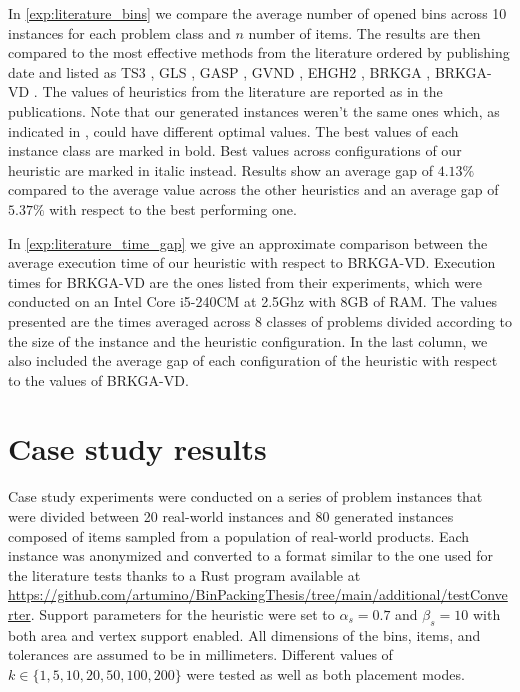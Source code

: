 In \cref{exp:literature_bins} we compare the average number of opened bins across 10 instances for each problem class and $n$ number of items.
The results are then compared to the most effective methods from the literature ordered by publishing date and listed as TS3 \citep{lodi2002heuristic}, GLS \citep{faroe2003guided}, GASP \citep{crainic2009ts2pack}, GVND \citep{parreno2010hybrid}, EHGH2 \citep{hifi2014hybrid}, BRKGA \citep{gonccalves2013biased}, BRKGA-VD \citep{zudio2018brkga}.
The values of heuristics from the literature are reported as in the publications. Note that our generated instances weren't the same ones which, as indicated in \cite{hifi2014hybrid}, could have different optimal values.
The best values of each instance class are marked in bold. Best values across configurations of our heuristic are marked in italic instead.
Results show an average gap of $4.13\%$ compared to the average value across the other heuristics and an average gap of $5.37\%$ with respect to the best performing one.

In \cref{exp:literature_time_gap} we give an approximate comparison between the average execution time of our heuristic with respect to BRKGA-VD.
Execution times for BRKGA-VD are the ones listed from their experiments, which were conducted on an Intel Core i5-240CM at 2.5Ghz with 8GB of RAM.
The values presented are the times averaged across 8 classes of problems divided according to the size of the instance and the heuristic configuration.
In the last column, we also included the average gap of each configuration of the heuristic with respect to the values of BRKGA-VD.
\label{exp:literature_tests}



\clearpage
\section{Case study results}
Case study experiments were conducted on a series of problem instances that were divided between 20 real-world instances and 80 generated instances composed of items sampled from a population of real-world products.
Each instance was anonymized and converted to a format similar to the one used for the literature tests thanks to a Rust program available at \url{https://github.com/artumino/BinPackingThesis/tree/main/additional/testConverter}.
Support parameters for the heuristic were set to $\alpha_s = 0.7$ and $\beta_s = 10$ with both area and vertex support enabled. All dimensions of the bins, items, and tolerances are assumed to be in millimeters.
Different values of $k \in \{1, 5, 10, 20, 50, 100, 200\}$ were tested as well as both placement modes.

